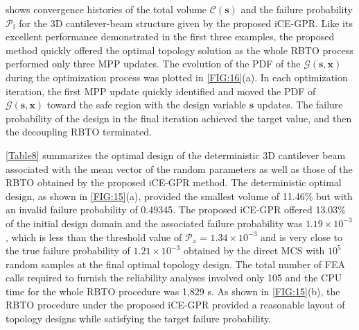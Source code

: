 \documentclass[preprint,3p]{elsarticle}
\begin{document}
\begin{linenumbers}
 shows convergence histories of the total volume $\mathcal{C}(\textbf{s})$ and the failure probability $\mathcal{P}_\text{f}$ for the 3D cantilever-beam structure given by the proposed iCE-GPR. Like its excellent performance demonstrated in the first three examples, the proposed method quickly offered the optimal topology solution as the whole RBTO process performed only three MPP updates. The evolution of the PDF of the $\mathcal{G}(\textbf{s},\textbf{x})$ during the optimization process was plotted in \cref{FIG:16}(a). In each optimization iteration, the first MPP update quickly identified and moved the PDF of $\mathcal{G}(\textbf{s},\textbf{x})$ toward the safe region with the design variable $\textbf{s}$ updates. The failure probability of the design in the final iteration achieved the target value, and then the decoupling RBTO terminated.

\cref{Table8} summarizes the optimal design of the deterministic 3D cantilever beam associated with the mean vector of the random parameters as well as those of the RBTO obtained by the proposed iCE-GPR method. The deterministic optimal design, as shown in \cref{FIG:15}(a), provided the smallest volume of 11.46\% but with an invalid failure probability of 0.49345. The proposed iCE-GPR offered 13.03\% of the initial design domain and the associated failure probability was $1.19\times10^{-3}$, which is less than the threshold value of $\mathcal{P}_\text{a}$ = $1.34\times10^{-3}$ and is very close to the true failure probability of $1.21\times10^{-3}$ obtained by the direct MCS with $10^5$ random samples at the final optimal topology design. The total number of FEA calls required to furnish the reliability analyses involved only 105 and the CPU time for the whole RBTO procedure was 1,829 s. As shown in \cref{FIG:15}(b), the RBTO procedure under the proposed iCE-GPR provided a reasonable layout of topology designs while satisfying the target failure probability. 


\end{linenumbers}
\end{document}

